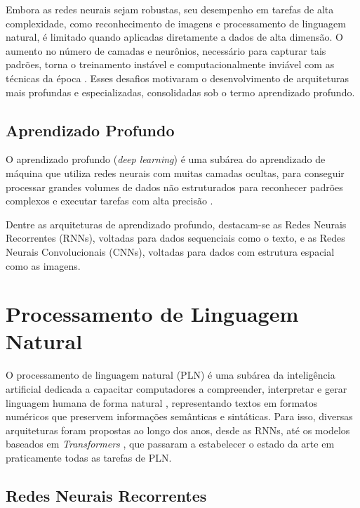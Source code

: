 Embora as redes neurais sejam robustas, seu desempenho em tarefas de alta complexidade, como reconhecimento de imagens e processamento de linguagem natural, é limitado quando aplicadas diretamente a dados de alta dimensão. O aumento no número de camadas e neurônios, necessário para capturar tais padrões, torna o treinamento instável e computacionalmente inviável com as técnicas da época \cite{goodfellow2016}. Esses desafios motivaram o desenvolvimento de arquiteturas mais profundas e especializadas, consolidadas sob o termo aprendizado profundo.

\subsection{Aprendizado Profundo}

O aprendizado profundo (\textit{deep learning}) é uma subárea do aprendizado de máquina que utiliza redes neurais com muitas camadas ocultas, para conseguir processar grandes volumes de dados não estruturados para reconhecer padrões complexos e executar tarefas com alta precisão \cite{lecun2015}.

Dentre as arquiteturas de aprendizado profundo, destacam-se as Redes Neurais Recorrentes (RNNs), voltadas para dados sequenciais como o texto, e as Redes Neurais Convolucionais (CNNs), voltadas para dados com estrutura espacial como as imagens.

\section{Processamento de Linguagem Natural}

O processamento de linguagem natural (PLN) é uma subárea da inteligência artificial 
dedicada a capacitar computadores a compreender, interpretar e gerar linguagem humana de forma 
natural \cite{jurafsky2026}, representando textos em formatos numéricos que preservem informações 
semânticas e sintáticas. Para isso, diversas arquiteturas foram
propostas ao longo dos anos, desde as RNNs, até os modelos baseados em \textit{Transformers} \cite{GoogleTeamTransformers},
que passaram a estabelecer o estado da arte em praticamente todas as tarefas de PLN.

\subsection{Redes Neurais Recorrentes}
 
